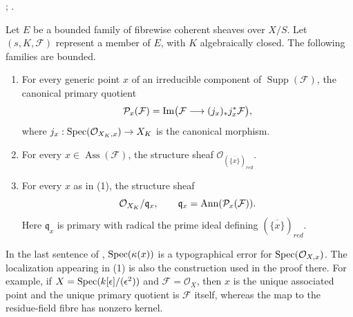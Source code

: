 \begin{proposition}
\label{proposition-bounded-coherent-primary-pieces}
\begin{reference}
\cite[Expos\'e 221, the paragraph following Proposition 1.3, p. 253]{FGA};
\cite[IV, 3.2.6 and 9.8.2--9.8.4]{EGA}.
\end{reference}
Let $E$ be a bounded family of fibrewise coherent sheaves over $X/S$.
Let $(s,K,\mathcal{F})$ represent a member of $E$, with $K$ algebraically
closed. The following families are bounded.
\begin{enumerate}
\item For every generic point $x$ of an irreducible component of
$\operatorname{Supp}(\mathcal{F})$, the canonical primary quotient
$$
\mathcal{P}_x(\mathcal{F}) =
\mathop{\rm Im}\bigl(
\mathcal{F} \longrightarrow (j_x)_*j_x^*\mathcal{F}
\bigr),
$$
where $j_x : \mathop{\mathrm{Spec}}(\mathcal{O}_{X_K,x}) \to X_K$ is the canonical
morphism.
\item For every $x \in \operatorname{Ass}(\mathcal{F})$, the structure
sheaf $\mathcal{O}_{(\overline{\{x\}})_{red}}$.
\item For every $x$ as in (1), the structure sheaf
$$
\mathcal{O}_{X_K}/\mathfrak q_x,
\qquad
\mathfrak q_x =
\mathop{\rm Ann}(\mathcal{P}_x(\mathcal{F})).
$$
Here $\mathfrak q_x$ is primary with radical the prime ideal defining
$(\overline{\{x\}})_{red}$.
\end{enumerate}
\end{proposition}

\begin{remark}
\label{remark-EGA-primary-localization-typo}
In the last sentence of \cite[IV, 3.2.6]{EGA},
$\mathop{\mathrm{Spec}}(\kappa(x))$ is a typographical error for
$\mathop{\mathrm{Spec}}(\mathcal{O}_{X,x})$. The localization appearing in (1) is also
the construction used in the proof there. For example, if
$X = \mathop{\mathrm{Spec}}(k[\epsilon]/(\epsilon^2))$ and
$\mathcal{F}=\mathcal{O}_X$, then $x$ is the unique associated point and
the unique primary quotient is $\mathcal{F}$ itself, whereas the map to
the residue-field fibre has nonzero kernel.
\end{remark}

